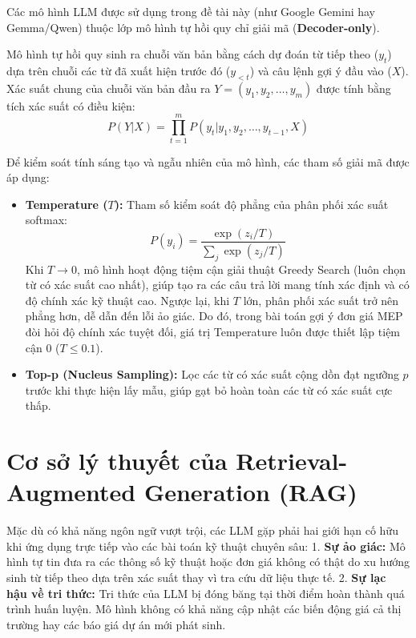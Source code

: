 Các mô hình LLM được sử dụng trong đề tài này (như Google Gemini hay Gemma/Qwen) thuộc lớp mô hình tự hồi quy chỉ giải mã (\textbf{Decoder-only}). 

Mô hình tự hồi quy sinh ra chuỗi văn bản bằng cách dự đoán từ tiếp theo ($y_t$) dựa trên chuỗi các từ đã xuất hiện trước đó ($y_{<t}$) và câu lệnh gợi ý đầu vào ($X$). Xác suất chung của chuỗi văn bản đầu ra $Y = (y_1, y_2, \dots, y_m)$ được tính bằng tích xác suất có điều kiện:
\begin{equation}
    P(Y | X) = \prod_{t=1}^{m} P(y_t | y_1, y_2, \dots, y_{t-1}, X)
\end{equation}

Để kiểm soát tính sáng tạo và ngẫu nhiên của mô hình, các tham số giải mã được áp dụng:
\begin{itemize}
    \item \textbf{Temperature ($T$):} Tham số kiểm soát độ phẳng của phân phối xác suất softmax:
    \begin{equation}
        P(y_i) = \frac{\exp(z_i / T)}{\sum_j \exp(z_j / T)}
    \end{equation}
    Khi $T \to 0$, mô hình hoạt động tiệm cận giải thuật Greedy Search (luôn chọn từ có xác suất cao nhất), giúp tạo ra các câu trả lời mang tính xác định và có độ chính xác kỹ thuật cao. Ngược lại, khi $T$ lớn, phân phối xác suất trở nên phẳng hơn, dễ dẫn đến lỗi ảo giác. Do đó, trong bài toán gợi ý đơn giá MEP đòi hỏi độ chính xác tuyệt đối, giá trị Temperature luôn được thiết lập tiệm cận 0 ($T \le 0.1$).
    \item \textbf{Top-p (Nucleus Sampling):} Lọc các từ có xác suất cộng dồn đạt ngưỡng $p$ trước khi thực hiện lấy mẫu, giúp gạt bỏ hoàn toàn các từ có xác suất cực thấp.
\end{itemize}

\section{Cơ sở lý thuyết của Retrieval-Augmented Generation (RAG)}

Mặc dù có khả năng ngôn ngữ vượt trội, các LLM gặp phải hai giới hạn cố hữu khi ứng dụng trực tiếp vào các bài toán kỹ thuật chuyên sâu:
1. \textbf{Sự ảo giác:} Mô hình tự tin đưa ra các thông số kỹ thuật hoặc đơn giá không có thật do xu hướng sinh từ tiếp theo dựa trên xác suất thay vì tra cứu dữ liệu thực tế.
2. \textbf{Sự lạc hậu về tri thức:} Tri thức của LLM bị đóng băng tại thời điểm hoàn thành quá trình huấn luyện. Mô hình không có khả năng cập nhật các biến động giá cả thị trường hay các báo giá dự án mới phát sinh.

